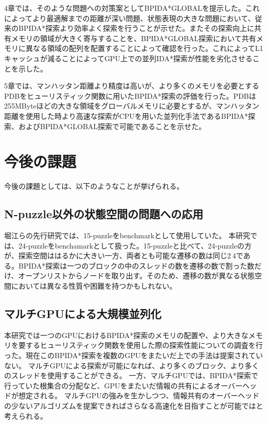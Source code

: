 \documentclass[a4paper,11pt,oneside,openany]{jsbook}
\begin{document}
4章では、そのような問題への対策案としてBPIDA*GLOBALを提示した。これによってより最適解までの距離が深い問題、状態表現の大きな問題において、従来のBPIDA*探索より効率よく探索を行うことが示せた。またその探索向上に共有メモリの領域が大きく寄与することを、BPIDA*GLOBAL探索において共有メモリに異なる領域の配列を配置することによって確認を行った。これによってL1キャッシュが減ることによってGPU上での並列IDA*探索が性能を劣化させることを示した。

5章では、マンハッタン距離より精度は高いが、より多くのメモリを必要とするPDBをヒューリスティック関数に用いたBPIDA*探索の評価を行った。PDBは255MByteほどの大きな領域をグローバルメモリに必要とするが、マンハッタン距離を使用した時より高速な探索がCPUを用いた並列化手法であるBPIDA*探索、およびBPIDA*GLOBAL探索で可能であることを示せた。

\section{今後の課題}
今後の課題としては、以下のようなことが挙げられる。

\subsection{N-puzzle以外の状態空間の問題への応用}
堀江らの先行研究\cite{HA17}では、15-puzzleをbenchmarkとして使用していた。
本研究では、24-puzzleをbenchamarkとして扱った。15-puzzleと比べて、24-puzzleの方が、探索空間ははるかに大きい一方、両者とも可能な遷移の数は同じ$2~4$である。BPIDA*探索は一つのブロックの中のスレッドの数を遷移の数で割った数だけ、オープンリストからノードを取り出す。そのため、遷移の数が異なる状態空間においては異なる性質や困難を持つかもしれない。


\subsection{マルチGPUによる大規模並列化}
本研究では一つのGPUにおけるBPIDA*探索のメモリの配置や、より大きなメモリを要するヒューリスティック関数を使用した際の探索性能についての調査を行った。現在このBPIDA*探索を複数のGPUをまたいだ上での手法は提案されていない。
マルチGPUによる探索が可能になれば、より多くのブロック、より多くのスレッドを使用することができる。
一方、マルチGPUでは、BPIDA*探索で行っていた根集合の分配など、GPUをまたいだ情報の共有によるオーバーヘッドが想定される。
マルチGPUの強みを生かしつつ、情報共有のオーバーヘッドの少ないアルゴリズムを提案できればさらなる高速化を目指すことが可能ではと考えられる。
\end{document}
